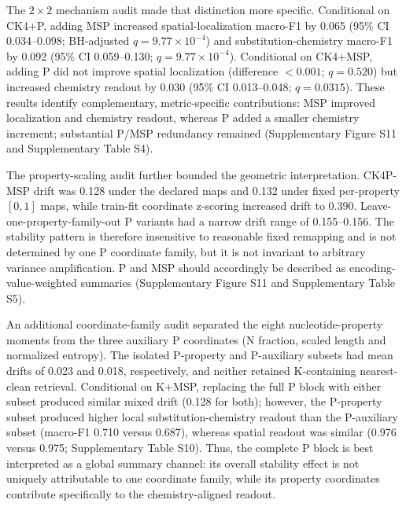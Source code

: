 The $2\times2$ mechanism audit made that distinction more specific. Conditional on CK4+P, adding MSP increased spatial-localization macro-F1 by 0.065 (95\% CI 0.034--0.098; BH-adjusted $q=9.77\times10^{-4}$) and substitution-chemistry macro-F1 by 0.092 (95\% CI 0.059--0.130; $q=9.77\times10^{-4}$). Conditional on CK4+MSP, adding P did not improve spatial localization (difference $<0.001$; $q=0.520$) but increased chemistry readout by 0.030 (95\% CI 0.013--0.048; $q=0.0315$). These results identify complementary, metric-specific contributions: MSP improved localization and chemistry readout, whereas P added a smaller chemistry increment; substantial P/MSP redundancy remained (Supplementary Figure S11 and Supplementary Table S4).

The property-scaling audit further bounded the geometric interpretation. CK4P-MSP drift was 0.128 under the declared maps and 0.132 under fixed per-property $[0,1]$ maps, while train-fit coordinate z-scoring increased drift to 0.390. Leave-one-property-family-out P variants had a narrow drift range of 0.155--0.156. The stability pattern is therefore insensitive to reasonable fixed remapping and is not determined by one P coordinate family, but it is not invariant to arbitrary variance amplification. P and MSP should accordingly be described as encoding-value-weighted summaries (Supplementary Figure S11 and Supplementary Table S5).

An additional coordinate-family audit separated the eight nucleotide-property moments from the three auxiliary P coordinates (N fraction, scaled length and normalized entropy). The isolated P-property and P-auxiliary subsets had mean drifts of 0.023 and 0.018, respectively, and neither retained K-containing nearest-clean retrieval. Conditional on K+MSP, replacing the full P block with either subset produced similar mixed drift (0.128 for both); however, the P-property subset produced higher local substitution-chemistry readout than the P-auxiliary subset (macro-F1 0.710 versus 0.687), whereas spatial readout was similar (0.976 versus 0.975; Supplementary Table S10). Thus, the complete P block is best interpreted as a global summary channel: its overall stability effect is not uniquely attributable to one coordinate family, while its property coordinates contribute specifically to the chemistry-aligned readout.

